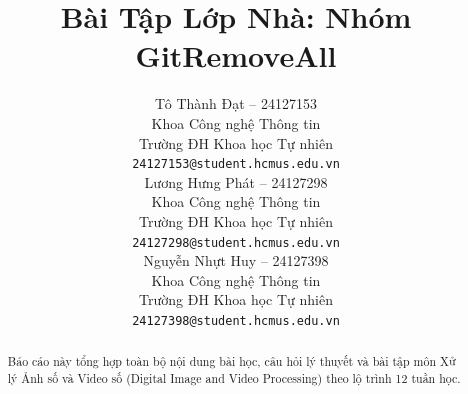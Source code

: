 \documentclass{article} %
\title{Bài Tập Lớp Nhà: Nhóm GitRemoveAll}
\author{
  Tô Thành Đạt -- 24127153 \\
  Khoa Công nghệ Thông tin \\
  Trường ĐH Khoa học Tự nhiên \\
  \texttt{24127153@student.hcmus.edu.vn} \\
  \And
  Lương Hưng Phát -- 24127298 \\
  Khoa Công nghệ Thông tin \\
  Trường ĐH Khoa học Tự nhiên \\
  \texttt{24127298@student.hcmus.edu.vn} \\
  \And
  Nguyễn Nhựt Huy -- 24127398 \\
  Khoa Công nghệ Thông tin \\
  Trường ĐH Khoa học Tự nhiên \\
  \texttt{24127398@student.hcmus.edu.vn} \\
}
\begin{document}

\clearpage

\maketitle

\begin{abstract}
Báo cáo này tổng hợp toàn bộ nội dung bài học, câu hỏi lý thuyết và bài tập môn Xử lý Ảnh số và Video số (Digital Image and Video Processing) theo lộ trình 12 tuần học.
\end{abstract}

\tableofcontents
\newpage


\newpage

% 
\newpage

\newpage

\newpage

\newpage

\newpage

% 
% 
% 
% 



\end{document}
